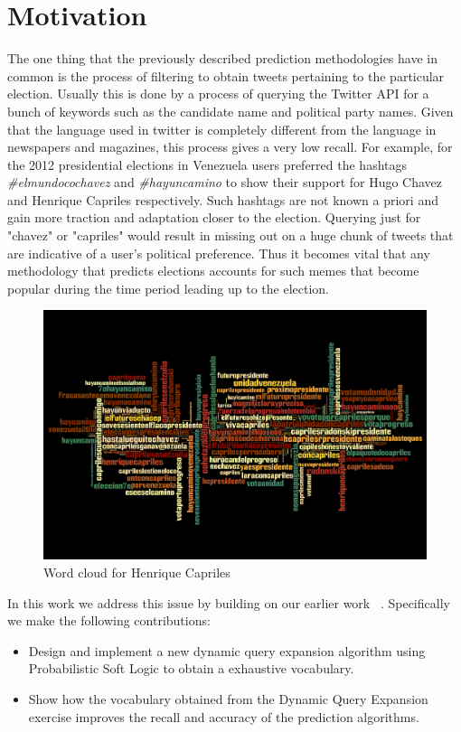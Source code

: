 \section{Motivation}
The one thing that the previously described prediction methodologies have in common is the process of filtering to obtain tweets pertaining to the particular election.
Usually this is done by a process of querying the Twitter API for a bunch of keywords such as the candidate name and political party names.
Given that the language used in twitter is completely different from the language in newspapers and magazines, this process gives a very low recall.
For example, for the 2012 presidential elections in Venezuela users preferred  the hashtags \emph{\#elmundocochavez} and \emph{\#hayuncamino} to show their support for Hugo Chavez and Henrique Capriles respectively.
Such hashtags are not known a priori and gain more traction and adaptation closer to the election.
Querying just for "chavez" or "capriles" would result in missing out on a huge chunk of tweets that are indicative of a user's political preference.
Thus it becomes vital that any methodology that predicts elections accounts for such memes that become popular during the time period leading up to the election.
\begin{figure}[ht]
	\centering
	\includegraphics[width=1.0\textwidth]{support_files/caprilesWordCloud.png}
	\vspace{-1em}
	\caption{Word cloud for Henrique Capriles}
	\label{fig:caprilesWordCloud}
	\vspace{-1em}
\end{figure}

In this work we address this issue by building on our earlier work ~\cite{huang2012social}.
Specifically we make the following contributions:
\begin{itemize}
\item
Design and implement a new dynamic query expansion algorithm using Probabilistic Soft Logic to obtain a exhaustive vocabulary.
\item
Show how the vocabulary obtained from the Dynamic Query Expansion exercise improves the recall and accuracy of the prediction algorithms.
\end{itemize}
